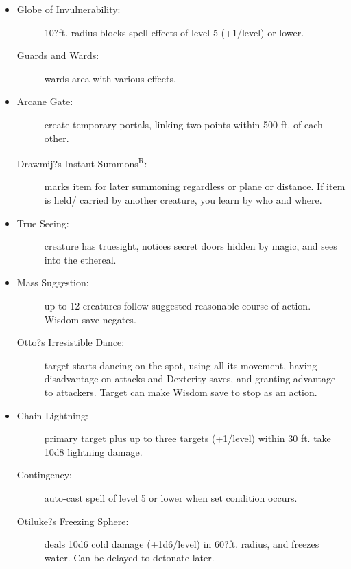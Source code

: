 \documentclass[DIV=14, paper=a4, fontsize=10pt, twocolumn, twoside]{scrartcl}
\begin{document}
\begin{itemize}[align=parleft,labelwidth=1cm]
	\renewcommand{\labelitemi}{Abjur}\item
	\begin{description}
 \item[Globe of Invulnerability:] 10?ft. radius blocks spell effects of level 5 (+1/level) or lower.
 \item[Guards and Wards:] wards area with various effects.
\end{description}
\renewcommand{\labelitemi}{Conj}\item
\begin{description}
 \item[Arcane Gate:] create temporary portals, linking two points within 500 ft. of each other.
 \item[Drawmij?s Instant Summons\textsuperscript{R}:] marks item for later summoning regardless or plane or distance. If item is held/ carried by another creature, you learn by who and where.
\end{description}
\renewcommand{\labelitemi}{Div}\item
\begin{description}
 \item[True Seeing:] creature has truesight, notices secret doors hidden by magic, and sees into the ethereal.
\end{description}
\renewcommand{\labelitemi}{Ench}\item
\begin{description}
 \item[Mass Suggestion:] up to 12 creatures follow suggested reasonable course of action. Wisdom save negates.
 \item[Otto?s Irresistible Dance:] target starts dancing on the spot, using all its movement, having disadvantage on attacks and Dexterity saves, and granting advantage to attackers. Target can make Wisdom save to stop as an action.
\end{description}
\renewcommand{\labelitemi}{Evoc}\item
\begin{description}
 \item[Chain Lightning:] primary target plus up to three targets (+1/level) within 30 ft. take 10d8 lightning damage.
 \item[Contingency:] auto-cast spell of level 5 or lower when set condition occurs.
 \item[Otiluke?s Freezing Sphere:] deals 10d6 cold damage (+1d6/level) in 60?ft. radius, and freezes water. Can be delayed to detonate later.

\end{description}
\end{itemize}
\end{document}
